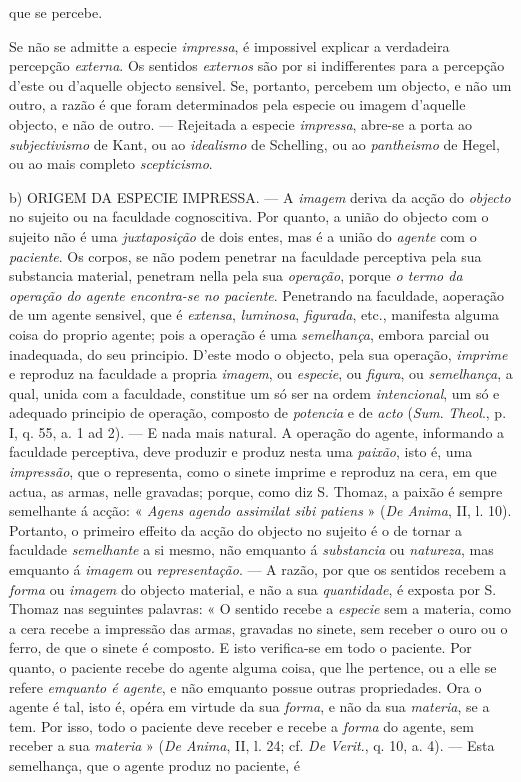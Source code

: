que se percebe.\par Se não se admitte a especie \emph{impressa}, é impossivel explicar a verdadeira percepção \emph{externa}. Os sentidos \emph{externos} são por si indifferentes para a percepção d'este ou d'aquelle objecto sensivel. Se, portanto, percebem um objecto, e não um outro, a razão é que foram determinados pela especie ou imagem d'aquelle objecto, e não de outro. --- Rejeitada a especie \emph{impressa}, abre-se a porta ao \emph{subjectivismo} de Kant, ou ao \emph{idealismo} de Schelling, ou ao \emph{pantheismo} de Hegel, ou ao mais completo \emph{scepticismo}.\par b) \textsc{ORIGEM} DA ESPECIE IMPRESSA. --- A \emph{imagem} deriva da acção do \emph{objecto} no sujeito ou na faculdade cognoscitiva. Por quanto, a união do objecto com o sujeito não é uma \emph{juxtaposição} de dois entes, mas é a união do \emph{agente} com o \emph{paciente}. Os corpos, se não podem penetrar na faculdade perceptiva pela sua substancia material, penetram nella pela sua \emph{operação}, porque \emph{o termo da operação do agente encontra-se no paciente}. Penetrando na faculdade, aoperação de um agente sensivel, que é \emph{extensa}, \emph{luminosa}, \emph{figurada}, etc., manifesta alguma coisa do proprio agente; pois a operação é uma \emph{semelhança}, embora parcial ou inadequada, do seu principio. D'este modo o objecto, pela sua operação, \emph{imprime} e reproduz na faculdade a propria \emph{imagem}, ou \emph{especie}, ou \emph{figura}, ou \emph{semelhança}, a qual, unida com a faculdade, constitue um só ser na ordem \emph{intencional}, um só e adequado principio de operação, composto de \emph{potencia} e de \emph{acto} (\emph{Sum}. \emph{Theol}., p. I, q. 55, a. 1 ad 2). --- E nada mais natural. A operação do agente, informando a faculdade perceptiva, deve produzir e produz nesta uma \emph{paixão}, isto é, uma \emph{impressão}, que o representa, como o sinete imprime e reproduz na cera, em que actua, as armas, nelle gravadas; porque, como diz S. Thomaz, a paixão é sempre semelhante á acção: « \emph{Agens agendo assimilat sibi patiens} » (\emph{De Anima}, II, l. 10). Portanto, o primeiro effeito da acção do objecto no sujeito é o de tornar a faculdade \emph{semelhante} a si mesmo, não emquanto á \emph{substancia} ou \emph{natureza}, mas emquanto á \emph{imagem} ou \emph{representação}. --- A razão, por que os sentidos recebem a \emph{forma} ou \emph{imagem} do objecto material, e não a sua \emph{quantidade}, é exposta por S. Thomaz nas seguintes palavras: « O sentido recebe a \emph{especie} sem a materia, como a cera recebe a impressão das armas, gravadas no sinete, sem receber o ouro ou o ferro, de que o sinete é composto. E isto verifica-se em todo o paciente. Por quanto, o paciente recebe do agente alguma coisa, que lhe pertence, ou a elle se refere \emph{emquanto é agente}, e não emquanto possue outras propriedades. Ora o agente é tal, isto é, opéra em virtude da sua \emph{forma}, e não da sua \emph{materia}, se a tem. Por isso, todo o paciente deve receber e recebe a \emph{forma} do agente, sem receber a sua \emph{materia} » (\emph{De Anima}, II, l. 24; cf. \emph{De Verit}., q. 10, a. 4). --- Esta semelhança, que o agente produz no paciente, é 